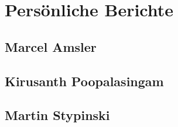 \newpage

\chapter{Persönliche Berichte}

\section{Marcel Amsler}


\newpage
\section{Kirusanth Poopalasingam}


\newpage
\section{Martin Stypinski}



